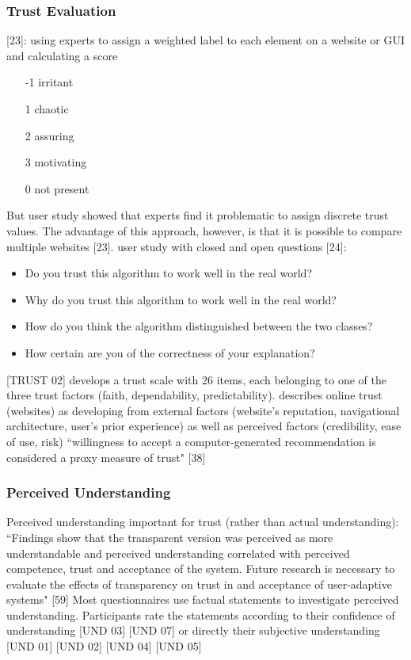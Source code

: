 \subsubsection{Trust Evaluation}
[23]: using experts to assign a weighted label to each element on a website or GUI and calculating a score
\begin{itemize}
	\item [-1] irritant
	\item [1] chaotic
	\item [2] assuring
	\item [3] motivating
	\item [0] not present
\end{itemize}
But user study showed that experts find it problematic to assign discrete trust values. The advantage of this approach, however, is that it is possible to compare multiple websites [23]. \newline
user study with closed and open questions [24]:
\begin{itemize}
	\item Do you trust this algorithm to work well in the real world?
	\item Why do you trust this algorithm to work well in the real world?
	\item How do you think the algorithm distinguished between the two classes?
	\item How certain are you of the correctness of your explanation? 
\end{itemize}
[TRUST 02] develops a trust scale with 26 items, each belonging to one of the three trust factors (faith, dependability, predictability). \newline
[TRUST 01] describes online trust (websites) as developing from external factors (website's reputation, navigational architecture, user's prior experience) as well as perceived factors (credibility, ease of use, risk) \newline
{\color{green}``willingness to accept a computer-generated recommendation is considered a proxy measure of trust" [38] }

\subsubsection{Perceived Understanding}
Perceived understanding important for trust (rather than actual understanding):\newline
``Findings show that the transparent version was perceived as more understandable and perceived understanding correlated with perceived competence, trust and acceptance of the system. Future research is necessary to evaluate the effects of transparency on trust in and acceptance of user-adaptive systems" [59] \newline
Most questionnaires use factual statements to investigate perceived understanding. Participants rate the statements according to their confidence of understanding [UND 03] [UND 07] or directly their subjective understanding [UND 01] [UND 02] [UND 04] [UND 05]






